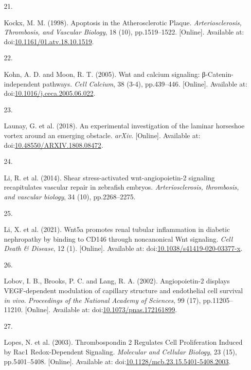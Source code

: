 \documentclass[
  11pt,
]{article}
\newlength{\cslhangindent}
\newlength{\csllabelwidth}
\newlength{\cslentryspacingunit} %
\newenvironment{CSLReferences}[2] %
 {%
  \setlength{\parindent}{0pt}
  \ifodd #1
  \let\oldpar\par
  \def\par{\hangindent=\cslhangindent\oldpar}
  \fi
  \setlength{\parskip}{#2\cslentryspacingunit}
 }%
 {}
\newcommand{\CSLLeftMargin}[1]{\parbox[t]{\csllabelwidth}{#1}}
\newcommand{\CSLRightInline}[1]{\parbox[t]{\linewidth - \csllabelwidth}{#1}\break}
\begin{document}
\begin{CSLReferences}{0}{0}
\leavevmode{}%
\CSLLeftMargin{21. }
\CSLRightInline{Kockx, M. M. (1998). {Apoptosis in the Atherosclerotic Plaque}. \emph{Arteriosclerosis, Thrombosis, and Vascular Biology}, 18 (10), pp.1519--1522. {[}Online{]}. Available at: doi:\href{https://doi.org/10.1161/01.atv.18.10.1519}{10.1161/01.atv.18.10.1519}.}

\leavevmode{}%
\CSLLeftMargin{22. }
\CSLRightInline{Kohn, A. D. and Moon, R. T. (2005). {Wnt and calcium signaling: β-Catenin-independent pathways}. \emph{Cell Calcium}, 38 (3-4), pp.439--446. {[}Online{]}. Available at: doi:\href{https://doi.org/10.1016/j.ceca.2005.06.022}{10.1016/j.ceca.2005.06.022}.}

\leavevmode{}%
\CSLLeftMargin{23. }
\CSLRightInline{Launay, G. {et al.} (2018). {An experimental investigation of the laminar horseshoe vortex around an emerging obstacle}. \emph{arXiv}. {[}Online{]}. Available at: doi:\href{https://doi.org/10.48550/ARXIV.1808.08472}{10.48550/ARXIV.1808.08472}.}

\leavevmode{}%
\CSLLeftMargin{24. }
\CSLRightInline{Li, R. {et al.} (2014). {Shear stress-activated wnt-angiopoietin-2 signaling recapitulates vascular repair in zebrafish embryos}. \emph{Arteriosclerosis, thrombosis, and vascular biology}, 34 (10), pp.2268--2275.}

\leavevmode{}%
\CSLLeftMargin{25. }
\CSLRightInline{Li, X. {et al.} (2021). {Wnt5a promotes renal tubular inflammation in diabetic nephropathy by binding to CD146 through noncanonical Wnt signaling}. \emph{Cell Death \& Disease}, 12 (1). {[}Online{]}. Available at: doi:\href{https://doi.org/10.1038/s41419-020-03377-x}{10.1038/s41419-020-03377-x}.}

\leavevmode{}%
\CSLLeftMargin{26. }
\CSLRightInline{Lobov, I. B., Brooks, P. C. and Lang, R. A. (2002). {Angiopoietin-2 displays VEGF-dependent modulation of capillary structure and endothelial cell survival {\emph{in vivo}}}. \emph{Proceedings of the National Academy of Sciences}, 99 (17), pp.11205--11210. {[}Online{]}. Available at: doi:\href{https://doi.org/10.1073/pnas.172161899}{10.1073/pnas.172161899}.}

\leavevmode{}%
\CSLLeftMargin{27. }
\CSLRightInline{Lopes, N. {et al.} (2003). {Thrombospondin 2 Regulates Cell Proliferation Induced by Rac1 Redox-Dependent Signaling}. \emph{Molecular and Cellular Biology}, 23 (15), pp.5401--5408. {[}Online{]}. Available at: doi:\href{https://doi.org/10.1128/mcb.23.15.5401-5408.2003}{10.1128/mcb.23.15.5401-5408.2003}.}


\end{CSLReferences}
\end{document}
